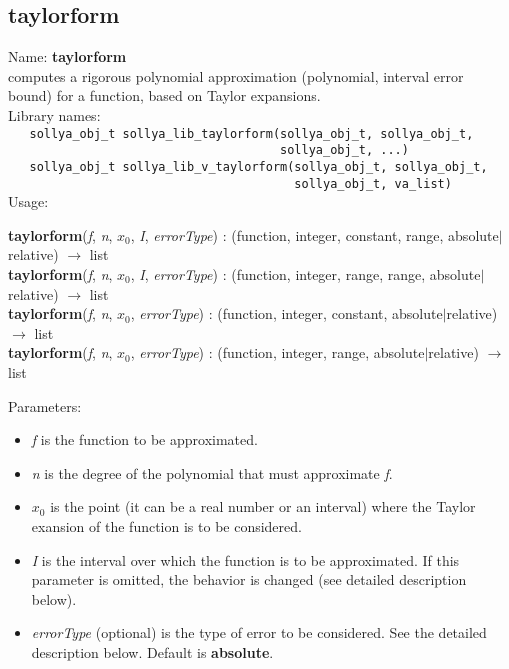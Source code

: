 \subsection{taylorform}
\label{labtaylorform}
\noindent Name: \textbf{taylorform}\\
\phantom{aaa}computes a rigorous polynomial approximation (polynomial, interval error bound) for a function, based on Taylor expansions.\\[0.2cm]
\noindent Library names:\\
\verb|   sollya_obj_t sollya_lib_taylorform(sollya_obj_t, sollya_obj_t,|\\
\verb|                                      sollya_obj_t, ...)|\\
\verb|   sollya_obj_t sollya_lib_v_taylorform(sollya_obj_t, sollya_obj_t,|\\
\verb|                                        sollya_obj_t, va_list)|\\[0.2cm]
\noindent Usage: 
\begin{center}
\textbf{taylorform}(\emph{f}, \emph{n}, \emph{$x_0$}, \emph{I}, \emph{errorType}) : (\textsf{function}, \textsf{integer}, \textsf{constant}, \textsf{range}, \textsf{absolute$|$relative}) $\rightarrow$ \textsf{list}\\
\textbf{taylorform}(\emph{f}, \emph{n}, \emph{$x_0$}, \emph{I}, \emph{errorType}) : (\textsf{function}, \textsf{integer}, \textsf{range}, \textsf{range}, \textsf{absolute$|$relative}) $\rightarrow$ \textsf{list}\\
\textbf{taylorform}(\emph{f}, \emph{n}, \emph{$x_0$}, \emph{errorType}) : (\textsf{function}, \textsf{integer}, \textsf{constant}, \textsf{absolute$|$relative}) $\rightarrow$ \textsf{list}\\
\textbf{taylorform}(\emph{f}, \emph{n}, \emph{$x_0$}, \emph{errorType}) : (\textsf{function}, \textsf{integer}, \textsf{range}, \textsf{absolute$|$relative}) $\rightarrow$ \textsf{list}\\
\end{center}
Parameters: 
\begin{itemize}
\item \emph{f} is the function to be approximated.
\item \emph{n} is the degree of the polynomial that must approximate \emph{f}.
\item \emph{$x_0$} is the point (it can be a real number or an interval) where the Taylor exansion of the function is to be considered.
\item \emph{I} is the interval over which the function is to be approximated. If this parameter is omitted, the behavior is changed (see detailed description below).
\item \emph{errorType} (optional) is the type of error to be considered. See the detailed description below. Default is \textbf{absolute}.
\end{itemize}

